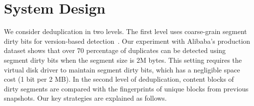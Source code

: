 \section{System Design}
\label{sect:arch}





We consider deduplication in two levels. The first level
uses coarse-grain segment  dirty bits for version-based detection~\cite{Clements2009,Vrable2009}.
Our experiment with Alibaba's production dataset shows that over 70 percentage of 
duplicates can be detected using segment dirty bits when the segment size is 2M bytes.  
This setting requires the virtual disk driver to maintain segment dirty bits,
which has a negligible space cost (1 bit per 2 MB). In the second level of deduplication, content blocks of dirty segments 
are compared with the fingerprints of unique  blocks from previous snapshots.
Our key strategies are explained as follows.
